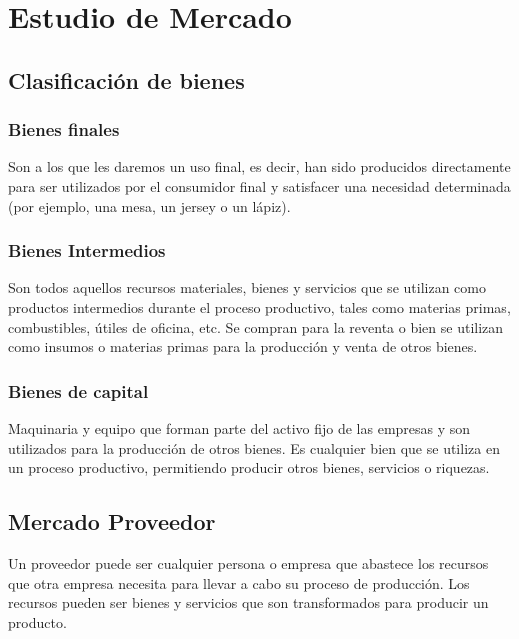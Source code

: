 \documentclass[../main]{subfiles}
\begin{document}
\chapter{Estudio de Mercado}

\section{Clasificación de bienes}
\subsection{Bienes finales}
 Son a los que les daremos un uso final, es decir, han sido producidos directamente para ser utilizados por el consumidor final y satisfacer una necesidad determinada (por ejemplo, una mesa, un jersey o un lápiz).
 
\subsection{Bienes Intermedios}
Son todos aquellos recursos materiales, bienes y servicios que se utilizan como productos intermedios durante el proceso productivo, tales como materias primas, combustibles, útiles de oficina, etc. Se compran para la reventa o bien se utilizan como insumos o materias primas para la producción y venta de otros bienes.

\subsection{Bienes de capital}
Maquinaria y equipo que forman parte del activo fijo de las empresas y son utilizados para la producción de otros bienes. Es cualquier bien que se utiliza en un proceso productivo, permitiendo producir otros bienes, servicios o riquezas.

\section{Mercado Proveedor}
Un proveedor puede ser cualquier persona o empresa que abastece los recursos que otra empresa necesita para llevar a cabo su proceso de producción. Los recursos pueden ser bienes y servicios que son transformados para producir un producto.
\end{document}
